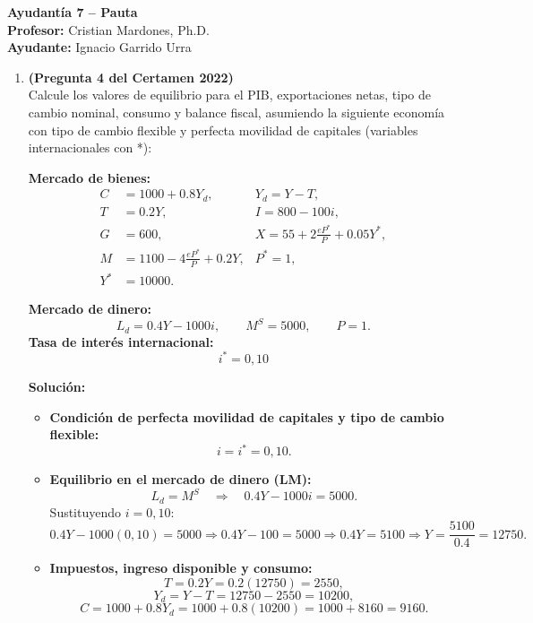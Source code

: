 \documentclass[11pt,addpoints]{article}
\begin{document}
\vspace*{0.1cm}
\begin{center}
\textbf{\LARGE Ayudantía 7 – Pauta}\\[0.3cm]
\textbf{Profesor:} Cristian Mardones, Ph.D.\\
\textbf{Ayudante:} Ignacio Garrido Urra
\end{center}

\begin{enumerate}

\item \textbf{(Pregunta 4 del Certamen 2022)}\\[0.1cm]
Calcule los valores de equilibrio para el PIB, exportaciones netas, tipo de cambio nominal, consumo y balance fiscal, asumiendo la siguiente economía con tipo de cambio flexible y perfecta movilidad de capitales (variables internacionales con *):

\textbf{Mercado de bienes:}
\[
\begin{aligned}
C &= 1000 + 0.8Y_d,  &Y_d = Y - T,  \\
T &= 0.2Y, &I = 800 - 100i,\\
G &= 600,  &X = 55 + 2\frac{eP^*}{P} + 0.05Y^*,\\
M &= 1100 - 4\frac{eP^*}{P} + 0.2Y, &P^* = 1,\\
Y^* &= 10000.
\end{aligned}
\]

\textbf{Mercado de dinero:}
\[
L_d = 0.4Y - 1000i, \qquad M^S = 5000, \qquad P = 1.
\]
\textbf{Tasa de interés internacional:} 
\[
i^* = 0{,}10
\] 

\textbf{Solución:}

\begin{itemize}
\item \textbf{Condición de perfecta movilidad de capitales y tipo de cambio flexible:}
\[
i = i^* = 0{,}10.
\]

\item \textbf{Equilibrio en el mercado de dinero (LM):}
\[
L_d = M^S \quad\Rightarrow\quad 0.4Y - 1000i = 5000.
\]
Sustituyendo $i = 0{,}10$:
\[
0.4Y - 1000(0{,}10) = 5000 \Rightarrow 0.4Y - 100 = 5000
\Rightarrow 0.4Y = 5100 \Rightarrow Y = \frac{5100}{0.4} = 12750.
\]

\item \textbf{Impuestos, ingreso disponible y consumo:}
\[
T = 0.2Y = 0.2(12750) = 2550,
\]
\[
Y_d = Y - T = 12750 - 2550 = 10200,
\]
\[
C = 1000 + 0.8Y_d = 1000 + 0.8(10200) = 1000 + 8160 = 9160.
\]


\end{itemize}
\end{enumerate}
\end{document}
